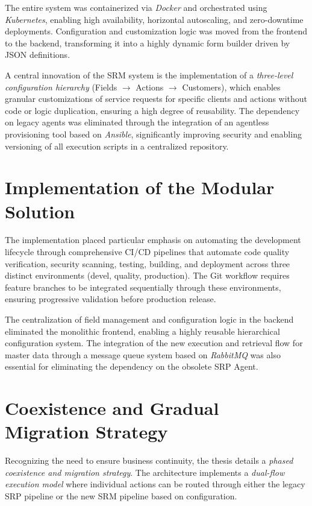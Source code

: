 The entire system was containerized via \textit{Docker} and orchestrated using \textit{Kubernetes}, enabling high availability, horizontal autoscaling, and zero-downtime deployments. Configuration and customization logic was moved from the frontend to the backend, transforming it into a highly dynamic form builder driven by JSON definitions.

A central innovation of the SRM system is the implementation of a \textit{three-level configuration hierarchy} (Fields $\rightarrow$ Actions $\rightarrow$ Customers), which enables granular customizations of service requests for specific clients and actions without code or logic duplication, ensuring a high degree of reusability. The dependency on legacy agents was eliminated through the integration of an agentless provisioning tool based on \textit{Ansible}, significantly improving security and enabling versioning of all execution scripts in a centralized repository.

\section*{\normalsize Implementation of the Modular Solution}

The implementation placed particular emphasis on automating the development lifecycle through comprehensive CI/CD pipelines that automate code quality verification, security scanning, testing, building, and deployment across three distinct environments (devel, quality, production). The Git workflow requires feature branches to be integrated sequentially through these environments, ensuring progressive validation before production release.

The centralization of field management and configuration logic in the backend eliminated the monolithic frontend, enabling a highly reusable hierarchical configuration system. The integration of the new execution and retrieval flow for master data through a message queue system based on \textit{RabbitMQ} was also essential for eliminating the dependency on the obsolete SRP Agent.

\section*{\normalsize Coexistence and Gradual Migration Strategy}

Recognizing the need to ensure business continuity, the thesis details a \textit{phased coexistence and migration strategy}. The architecture implements a \textit{dual-flow execution model} where individual actions can be routed through either the legacy SRP pipeline or the new SRM pipeline based on configuration.

